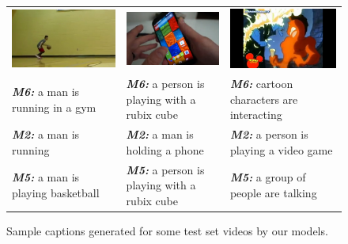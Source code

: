 \begin{figure}[thp]
  \begin{center}
  \newcommand{\mcCell}[1]{%
  \multicolumn{1}{c}{#1}}
  \centering
  \begin{adjustbox}{center}
  \tabcolsep=0.10cm
  \begin{tabular}{lll}
    \mcCell{\includegraphics[width=0.25\linewidth]{images/9150.png}} &
    \mcCell{\includegraphics[width=0.25\linewidth]{images/9799.png}} &
    \mcCell{\includegraphics[width=0.25\linewidth]{images/7997.png}} \\
    \textbf{\scriptsize\em M6:} \scriptsize a man is running in a gym &
    \textbf{\scriptsize\em M6:} \scriptsize a person is playing with a rubix cube &
    \textbf{\scriptsize\em M6:} \scriptsize cartoon characters are interacting\\
    \textbf{\scriptsize\em M2:} \scriptsize a man is running&
    \textbf{\scriptsize\em M2:} \scriptsize a man is holding a phone&
    \textbf{\scriptsize\em M2:} \scriptsize a person is playing a video game\\
    \textbf{\scriptsize\em M5:} \scriptsize a man is playing basketball&
    \textbf{\scriptsize\em M5:} \scriptsize a person is playing with a rubix cube &
    \textbf{\scriptsize\em M5:} \scriptsize a group of people are talking\\
  \end{tabular}
  \end{adjustbox}
  \end{center}
  \vspace{-5mm}
  \caption{Sample captions generated for some test set videos by our
          models.}
  \label{fig:capSamps}
\end{figure}

